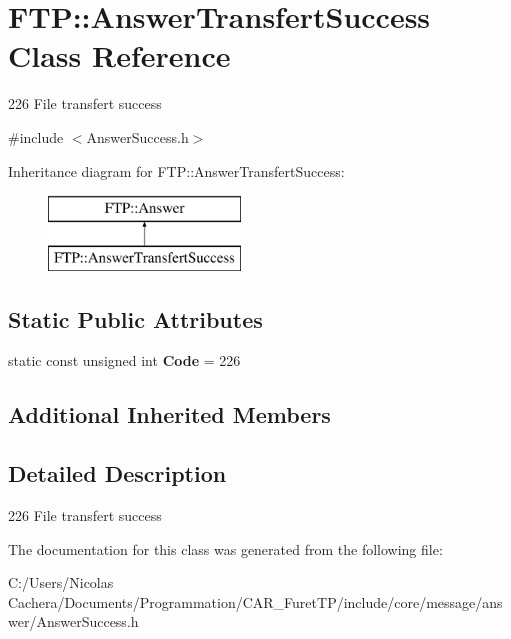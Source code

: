 \hypertarget{classFTP_1_1AnswerTransfertSuccess}{}\section{F\+T\+P\+:\+:Answer\+Transfert\+Success Class Reference}
\label{classFTP_1_1AnswerTransfertSuccess}


226 File transfert success  




{\ttfamily \#include $<$Answer\+Success.\+h$>$}

Inheritance diagram for F\+T\+P\+:\+:Answer\+Transfert\+Success\+:\begin{figure}[H]
\begin{center}
\leavevmode
\includegraphics[height=2.000000cm]{classFTP_1_1AnswerTransfertSuccess}
\end{center}
\end{figure}
\subsection*{Static Public Attributes}
\begin{DoxyCompactItemize}
\item 
\hypertarget{classFTP_1_1AnswerTransfertSuccess_a5f298ee0643cb6879316cda93e94ea3f}{}static const unsigned int {\bfseries Code} = 226\label{classFTP_1_1AnswerTransfertSuccess_a5f298ee0643cb6879316cda93e94ea3f}

\end{DoxyCompactItemize}
\subsection*{Additional Inherited Members}


\subsection{Detailed Description}
226 File transfert success 

The documentation for this class was generated from the following file\+:\begin{DoxyCompactItemize}
\item 
C\+:/\+Users/\+Nicolas Cachera/\+Documents/\+Programmation/\+C\+A\+R\+\_\+\+Furet\+T\+P/include/core/message/answer/Answer\+Success.\+h\end{DoxyCompactItemize}
